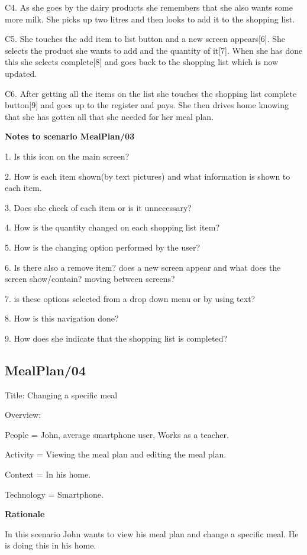 	C4. As she goes by the dairy products she remembers that she also wants some more milk. She picks up two litres and then looks to add it to the shopping list.
	
	C5. She touches the add item to list button and a new screen appears[6]. She selects the product she wants to add and the quantity of it[7]. When she has done this she selects complete[8] and goes back to the shopping list which is now updated.
	
	C6. After getting all the items on the list she touches the shopping list complete button[9] and goes up to the register and pays. She then drives home knowing that she has gotten all that she needed for her meal plan.    
	
\textbf{Notes to scenario MealPlan/03}

1. Is this icon on the main screen?

2. How is each item shown(by text pictures) and what information is shown to each item.

3. Does she check of each item or is it unnecessary?

4. How is the quantity changed on each shopping list item?  

5. How is the changing option performed by the user?

6. Is there also a remove item? does a new screen appear and what does the screen show/contain? moving between screens?

7. is these options selected from a drop down menu or by using text?

8. How is this navigation done?

9. How does she indicate that the shopping list is completed?

\subsection{MealPlan/04} \label{MealPlan04}

Title: Changing a specific meal

Overview:
	
	People = John, average smartphone user, Works as a teacher.
	
	Activity = Viewing the meal plan and editing the meal plan.
	
	Context = In his home. 
	
	Technology = Smartphone.
	
\textbf{Rationale}

In this scenario John wants to view his meal plan and change a specific meal. He is doing this in his home.

